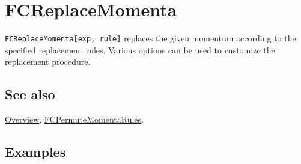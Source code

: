 \documentclass[../FeynCalcManual.tex]{subfiles}
\begin{document}
\hypertarget{fcreplacemomenta}{%
\section{FCReplaceMomenta}\label{fcreplacemomenta}}

\texttt{FCReplaceMomenta[\allowbreak{}exp,\ \allowbreak{}rule]} replaces
the given momentum according to the specified replacement rules. Various
options can be used to customize the replacement procedure.

\subsection{See also}

\hyperlink{toc}{Overview},
\hyperlink{fcpermutemomentarules}{FCPermuteMomentaRules}.

\subsection{Examples}
\end{document}
